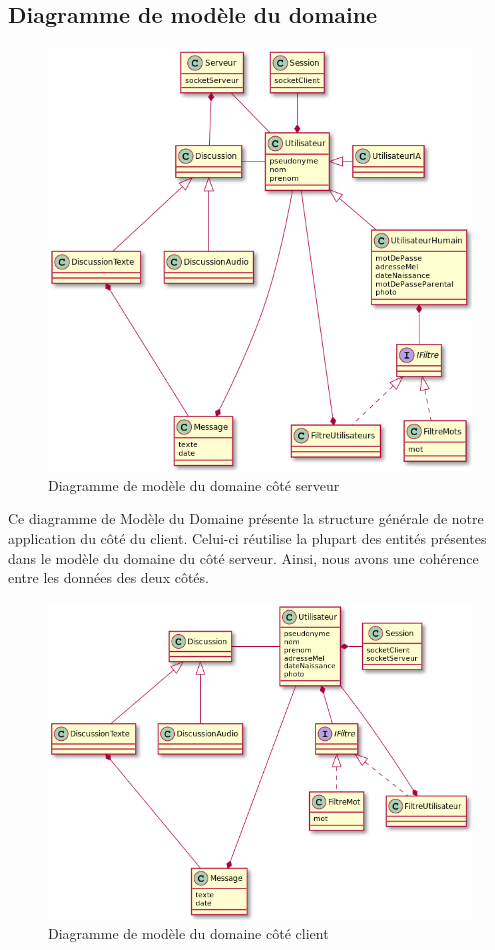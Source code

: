\documentclass[a4paper,12pt]{article}
\begin{document}
	\subsection{Diagramme de modèle du domaine}

	\begin{figure}[H]
		\centerline{\includegraphics[width=16.5cm]{../diagrammes/img/modeleDomaineServeur.png}}
		\caption{Diagramme de modèle du domaine côté serveur}
	\end{figure}

	Ce diagramme de Modèle du Domaine présente la structure générale de notre application du côté du client.
	Celui-ci réutilise la plupart des entités présentes dans le modèle du domaine du côté serveur.
	Ainsi, nous avons une cohérence entre les données des deux côtés.
	\begin{figure}[H]
		\centerline{\includegraphics[width=16.5cm]{../diagrammes/img/modeleDomaineClient.png}}
		\caption{Diagramme de modèle du domaine côté client}
	\end{figure}
\end{document}
